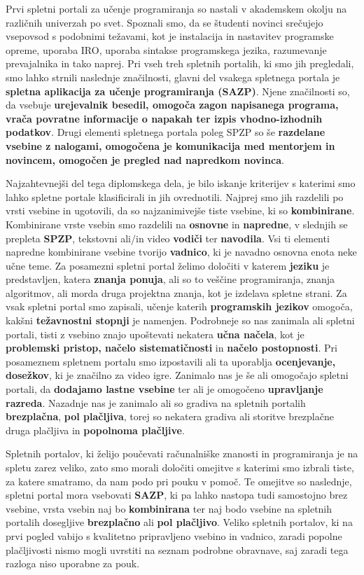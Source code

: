 Prvi spletni portali za učenje programiranja so nastali v akademskem
okolju na različnih univerzah po svet. Spoznali smo, da se študenti
novinci srečujejo vsepovsod s podobnimi težavami, kot je instalacija
in nastavitev programske opreme, uporaba IRO, uporaba sintakse
programskega jezika, razumevanje prevajalnika in tako
naprej. Pri vseh treh spletnih portalih, ki smo jih pregledali, smo
lahko strnili naslednje značilnosti, glavni del vsakega spletnega
portala je \textbf{spletna aplikacija za učenje programiranja
  (SAZP)}. Njene značilnosti so, da vsebuje \textbf{urejevalnik
  besedil, omogoča zagon napisanega programa, vrača povratne
  informacije o napakah ter izpis vhodno-izhodnih podatkov}. Drugi
elementi spletnega portala poleg SPZP so še \textbf{razdelane vsebine
  z nalogami, omogočena je komunikacija med mentorjem in novincem,
  omogočen je pregled nad napredkom novinca}.

Najzahtevnejši del tega diplomskega dela, je bilo iskanje kriterijev s
katerimi smo lahko spletne portale klasificirali in jih
ovrednotili. Najprej smo jih razdelili po vrsti vsebine in
ugotovili, da so najzanimivejše tiste vsebine, ki so
\textbf{kombinirane}. Kombinirane vrste vsebin smo razdelili na
\textbf{osnovne} in \textbf{napredne}, v slednjih se prepleta
\textbf{SPZP}, tekstovni ali/in video \textbf{vodiči} ter
\textbf{navodila}. Vsi ti elementi napredne kombinirane vsebine
tvorijo \textbf{vadnico}, ki je navadno osnovna enota neke učne teme.
Za posamezni spletni portal želimo določiti v katerem \textbf{jeziku}
je predstavljen, katera \textbf{znanja ponuja}, ali so to veščine
programiranja, znanja algoritmov, ali morda druga projektna znanja,
kot je izdelava spletne strani. Za vsak spletni portal smo zapisali,
učenje katerih \textbf{programskih jezikov} omogoča, kakšni
\textbf{težavnostni stopnji} je namenjen. Podrobneje so nas zanimala
ali spletni portali, tisti z vsebino znajo upoštevati nekatera
\textbf{učna načela}, kot je \textbf{problemski pristop, načelo
  sistematičnosti} in \textbf{načelo postopnosti}. Pri posameznem
spletnem portalu smo izpostavili ali ta uporablja \textbf{ocenjevanje,
dosežkov}, ki je značilno za video igre. Zanimalo nas je še ali
omogočajo spletni portali, da \textbf{dodajamo lastne vsebine} ter ali je
omogočeno \textbf{upravljanje razreda}. Nazadnje nas je zanimalo ali
so gradiva na spletnih portalih \textbf{brezplačna}, \textbf{pol
  plačljiva}, torej so nekatera gradiva ali storitve brezplačne druga
plačljiva in \textbf{popolnoma plačljive}.

Spletnih portalov, ki želijo poučevati računalniške znanosti in
programiranja je na spletu zarez veliko, zato smo morali določiti
omejitve s katerimi smo izbrali tiste, za katere smatramo, da nam podo
pri pouku v pomoč. Te omejitve so naslednje, spletni portal mora
vsebovati \textbf{SAZP}, ki pa lahko nastopa tudi samostojno brez
vsebine, vrsta vsebin naj bo \textbf{kombinirana} ter naj bodo vsebine
na spletnih portalih dosegljive \textbf{brezplačno} ali \textbf{pol
  plačljivo}. Veliko spletnih portalov, ki na prvi pogled vabijo s
kvalitetno pripravljeno vsebino in vadnico, zaradi popolne
plačljivosti nismo mogli uvrstiti na seznam podrobne obravnave, saj
zaradi tega razloga niso uporabne za pouk.

